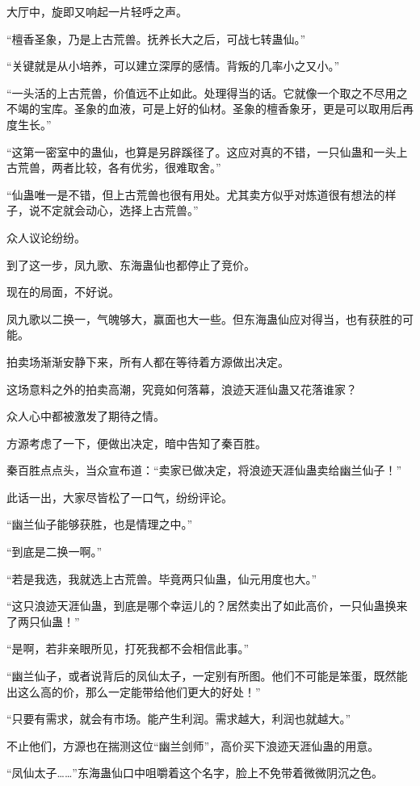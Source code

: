 \begin{this_body}
大厅中，旋即又响起一片轻呼之声。

“檀香圣象，乃是上古荒兽。抚养长大之后，可战七转蛊仙。”

“关键就是从小培养，可以建立深厚的感情。背叛的几率小之又小。”

“一头活的上古荒兽，价值远不止如此。处理得当的话。它就像一个取之不尽用之不竭的宝库。圣象的血液，可是上好的仙材。圣象的檀香象牙，更是可以取用后再度生长。”

“这第一密室中的蛊仙，也算是另辟蹊径了。这应对真的不错，一只仙蛊和一头上古荒兽，两者比较，各有优劣，很难取舍。”

“仙蛊唯一是不错，但上古荒兽也很有用处。尤其卖方似乎对炼道很有想法的样子，说不定就会动心，选择上古荒兽。”

众人议论纷纷。

到了这一步，凤九歌、东海蛊仙也都停止了竞价。

现在的局面，不好说。

凤九歌以二换一，气魄够大，赢面也大一些。但东海蛊仙应对得当，也有获胜的可能。

拍卖场渐渐安静下来，所有人都在等待着方源做出决定。

这场意料之外的拍卖高潮，究竟如何落幕，浪迹天涯仙蛊又花落谁家？

众人心中都被激发了期待之情。

方源考虑了一下，便做出决定，暗中告知了秦百胜。

秦百胜点点头，当众宣布道：“卖家已做决定，将浪迹天涯仙蛊卖给幽兰仙子！”

此话一出，大家尽皆松了一口气，纷纷评论。

“幽兰仙子能够获胜，也是情理之中。”

“到底是二换一啊。”

“若是我选，我就选上古荒兽。毕竟两只仙蛊，仙元用度也大。”

“这只浪迹天涯仙蛊，到底是哪个幸运儿的？居然卖出了如此高价，一只仙蛊换来了两只仙蛊！”

“是啊，若非亲眼所见，打死我都不会相信此事。”

“幽兰仙子，或者说背后的凤仙太子，一定别有所图。他们不可能是笨蛋，既然能出这么高的价，那么一定能带给他们更大的好处！”

“只要有需求，就会有市场。能产生利润。需求越大，利润也就越大。”

不止他们，方源也在揣测这位“幽兰剑师”，高价买下浪迹天涯仙蛊的用意。

“凤仙太子……”东海蛊仙口中咀嚼着这个名字，脸上不免带着微微阴沉之色。


\end{this_body}
